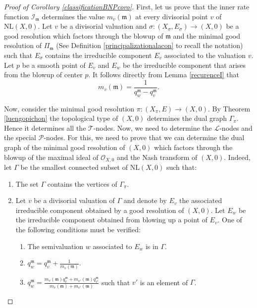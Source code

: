\documentclass[reqno,dvipsnames,12pt]{amsart}
\begin{document}
\begin{proof}[Proof of Corollary \ref{classificationBNPcoro}]
	
First, let us prove that the inner rate function $\mathcal{I}_{\mathfrak{m}}$ determines the value $m_v(\mathfrak{m})$ at every divisorial point $v$ of $\mathrm{NL}(X,0)$. Let $v$ be a divisorial valuation and $\sigma:(X_{\sigma},E_{\sigma}) \longrightarrow (X,0)$ be a good resolution which factors through the blowup of $\mathfrak{m}$ and the minimal good resolution of $\Pi_{\mathfrak{m}}$ (See Definition \ref{principalizationalacon} to recall the notation) such that $E_{\sigma}$ contains the irreducible component $E_v$ associated to the valuation $v$. Let $p$ be a smooth point of $E_v$ and  $E_w$ be the irreducible component that arises from the blowup of center $p$. It follows directly from Lemma \ref{recurenceI} that $$  m_v(\mathfrak{m})=\frac{1}{q_w^{\mathfrak{m}} - q_v^{\mathfrak{m}}}.$$ 
	
	
	
	
	
	
	
	  Now, consider the minimal good resolution $\pi:(X_{\pi},E) \longrightarrow (X,0)$. By Theorem \ref{luengopichon} the topological type of $(X,0)$ determines the dual graph $\Gamma_{\pi}$. Hence it determines all the $\mathcal{T}$-nodes. Now, we need to determine the $\mathcal{L}$-nodes and the special $\mathcal{P}$-nodes. For this, we need to prove that we can determine the dual graph of the minimal good resolution of $(X,0)$ which factors through the blowup of the maximal ideal of $\mathcal{O}_{X,0}$ and the Nash transform of $(X,0)$. Indeed, let $\Gamma$ be the smallest connected subset of $\mathrm{NL}(X,0)$ such that:
	  \begin{enumerate}
	  	\item The set $\Gamma$ contains the vertices of $\Gamma_{\pi}$.
	  	\item Let $v$ be a divisorial valuation of $\Gamma$ and denote by $E_v$ the associated irreducible component obtained by a good resolution of $(X,0)$. Let $E_w$ be the irreducible component obtained from blowing up a point of $E_v$. One of the following conditions must be verified:  \begin{enumerate}
	  		\item The semivaluation $w$ associated to $E_w$ is in $\Gamma$.
	  		\item $q_w^\mathfrak{m}=q_v^\mathfrak{m}+\frac{1}{m_v(\mathfrak{m})}$.
	  		\item $q_w^\mathfrak{m}=\frac{m_v(\mathfrak{m})q_v^\mathfrak{m}+m_{v'}(\mathfrak{m})q_{v'}^\mathfrak{m}}{m_v(\mathfrak{m})+m_{v'}(\mathfrak{m})}$  such that $v'$ is an element of $\Gamma$.
	  	\end{enumerate}
	  	

\end{enumerate}
\end{proof}
\end{document}
